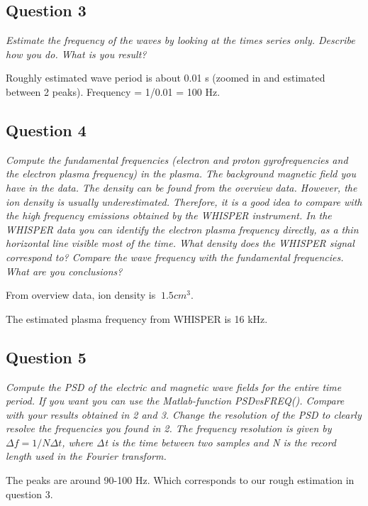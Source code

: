 \documentclass{article}
\begin{document}
\subsection{Question 3}
\textit{Estimate the frequency of the waves by looking at the times series only. Describe how you do. What is you result?}

Roughly estimated wave period is about 0.01 s (zoomed in and estimated between 2 peaks). Frequency = 1/0.01 = 100 Hz.

\subsection{Question 4}
\textit{Compute the fundamental frequencies (electron and proton gyrofrequencies and the electron plasma frequency) in the plasma. The background magnetic field you have in the data. The density can be found from the overview data. However, the ion density is usually underestimated. Therefore, it is a good idea to compare with the high frequency emissions obtained by the WHISPER instrument. In the WHISPER data you can identify the electron plasma frequency directly, as a thin horizontal line visible most of the time. What density does the WHISPER signal correspond to? Compare the wave frequency with the fundamental frequencies. What are you conclusions?}

From overview data, ion density is $~1.5 cm^3$. 

The estimated plasma frequency from WHISPER is 16 kHz.

\subsection{Question 5}
\textit{Compute the PSD of the electric and magnetic wave fields for the entire time period. If you want you can use the Matlab-function PSDvsFREQ(). Compare with your results obtained in 2 and 3. Change the resolution of the PSD to clearly resolve the frequencies you found in 2. The frequency resolution is given by $Δf=1/NΔt$, where Δt is the time between two samples and N is the record length used in the Fourier transform.}

The peaks are around 90-100 Hz. Which corresponds to our rough estimation in question 3.
\end{document}
